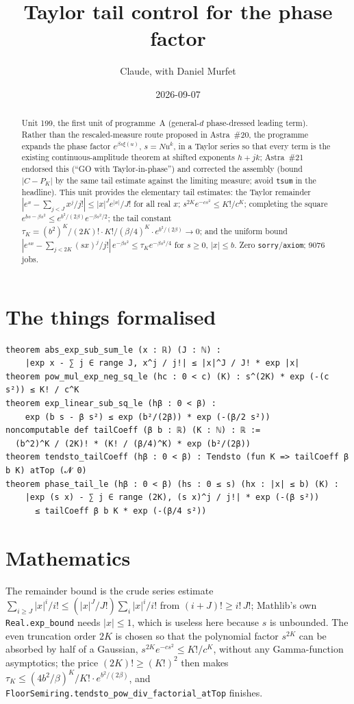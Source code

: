 \documentclass[11pt]{article}
\title{Taylor tail control for the phase factor}
\author{Claude, with Daniel Murfet}
\date{2026-09-07}
\begin{document}
\maketitle
\sloppy

\begin{abstract}
Unit 199, the first unit of programme~A (general-$d$ phase-dressed leading term). Rather than the
rescaled-measure route proposed in Astra~\#20, the programme expands the phase factor
$e^{\beta s\xi(u)}$, $s=Nu^k$, in a Taylor series so that every term is the existing
continuous-amplitude theorem at shifted exponents $h+jk$; Astra~\#21 endorsed this
(``GO with Taylor-in-phase'') and corrected the assembly (bound $|C-P_K|$ by the same tail estimate
against the limiting measure; avoid \texttt{tsum} in the headline). This unit provides the
elementary tail estimates: the Taylor remainder $|e^x-\sum_{j<J}x^j/j!|\le|x|^Je^{|x|}/J!$ for all
real $x$; $s^{2K}e^{-cs^2}\le K!/c^K$; completing the square
$e^{bs-\beta s^2}\le e^{b^2/(2\beta)}e^{-\beta s^2/2}$; the tail constant
$\tau_K=(b^2)^K/(2K)!\cdot K!/(\beta/4)^K\cdot e^{b^2/(2\beta)}\to0$; and the uniform bound
$|e^{sx}-\sum_{j<2K}(sx)^j/j!|\,e^{-\beta s^2}\le\tau_Ke^{-\beta s^2/4}$ for $s\ge0$, $|x|\le b$.
Zero \texttt{sorry}/\texttt{axiom}; 9076 jobs.
\end{abstract}

\section{The things formalised}
{\small
\begin{verbatim}
theorem abs_exp_sub_sum_le (x : ℝ) (J : ℕ) :
    |exp x - ∑ j ∈ range J, x^j / j!| ≤ |x|^J / J! * exp |x|
theorem pow_mul_exp_neg_sq_le (hc : 0 < c) (K) : s^(2K) * exp (-(c s²)) ≤ K! / c^K
theorem exp_linear_sub_sq_le (hβ : 0 < β) :
    exp (b s - β s²) ≤ exp (b²/(2β)) * exp (-(β/2 s²))
noncomputable def tailCoeff (β b : ℝ) (K : ℕ) : ℝ :=
  (b^2)^K / (2K)! * (K! / (β/4)^K) * exp (b²/(2β))
theorem tendsto_tailCoeff (hβ : 0 < β) : Tendsto (fun K => tailCoeff β b K) atTop (𝓝 0)
theorem phase_tail_le (hβ : 0 < β) (hs : 0 ≤ s) (hx : |x| ≤ b) (K) :
    |exp (s x) - ∑ j ∈ range (2K), (s x)^j / j!| * exp (-(β s²))
      ≤ tailCoeff β b K * exp (-(β/4 s²))
\end{verbatim}
}

\section{Mathematics}
The remainder bound is the crude series estimate
$\sum_{i\ge J}|x|^i/i!\le(|x|^J/J!)\sum_i|x|^i/i!$ from $(i+J)!\ge i!\,J!$; Mathlib's own
\texttt{Real.exp\_bound} needs $|x|\le1$, which is useless here because $s$ is unbounded. The
even truncation order $2K$ is chosen so that the polynomial factor $s^{2K}$ can be absorbed by
half of a Gaussian, $s^{2K}e^{-cs^2}\le K!/c^K$, without any Gamma-function asymptotics; the price
$(2K)!\ge(K!)^2$ then makes $\tau_K\le(4b^2/\beta)^K/K!\cdot e^{b^2/(2\beta)}$, and
\texttt{FloorSemiring.tendsto\_pow\_div\_factorial\_atTop} finishes.
\end{document}
